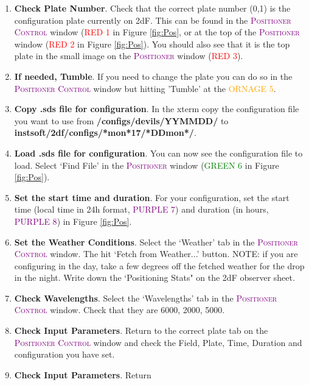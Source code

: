 \documentclass[12pt]{article}
\begin{document}
\begin{enumerate}

\item \textbf{Check Plate Number}. Check that the correct plate number (0,1) is the configuration plate currently on 2dF. This can be found in the \textsc{\textcolor{purple}{Positioner Control}} window ({\textcolor{red}{RED 1}} in Figure \ref{fig:Pos}, or at the top of the \textsc{\textcolor{purple}{Positioner}} window ({\textcolor{red}{RED 2}} in Figure \ref{fig:Pos}). You should also see that it is the top plate in the small image on the  \textsc{\textcolor{purple}{Positioner}} window ({\textcolor{red}{RED 3}}). 

\item \textbf{If needed, Tumble}.  If you need to change the plate you can do so in the \textsc{\textcolor{purple}{Positioner Control}} window but hitting 'Tumble' at the {\textcolor{orange}{ORNAGE 5}}.

\item \textbf{Copy .sds file for configuration}. In the xterm copy the configuration file you want to use from \textbf{/configs/devils/YYMMDD/} to \textbf{instsoft/2df/configs/*mon*17/*DDmon*/}.

\item \textbf{Load .sds file for configuration}. You can now see the configuration file to load. Select `Find File' in the \textsc{\textcolor{purple}{Positioner}} window ({\textcolor{green}{GREEN 6}} in Figure \ref{fig:Pos}).

\item \textbf{Set the start time and duration}. For your configuration, set the start time (local time in 24h format, {\textcolor{purple}{PURPLE 7}}) and duration  (in hours, {\textcolor{purple}{PURPLE 8}}) in Figure \ref{fig:Pos}.

\item \textbf{Set the Weather Conditions}. Select the `Weather' tab in the \textsc{\textcolor{purple}{Positioner Control}} window. The hit `Fetch from Weather...' button. NOTE: if you are configuring in the day, take a few degrees off the fetched weather for the drop in the night. Write down the `Positioning Stats" on the 2dF observer sheet. 

\item \textbf{Check Wavelengths}. Select the `Wavelengths' tab in the \textsc{\textcolor{purple}{Positioner Control}} window. Check that they are 6000, 2000, 5000.

\item \textbf{Check Input Parameters}. Return to the correct plate tab on the \textsc{\textcolor{purple}{Positioner Control}} window and check the Field, Plate, Time, Duration and configuration you have set.   

\item \textbf{Check Input Parameters}. Return

\end{enumerate}
\end{document}
